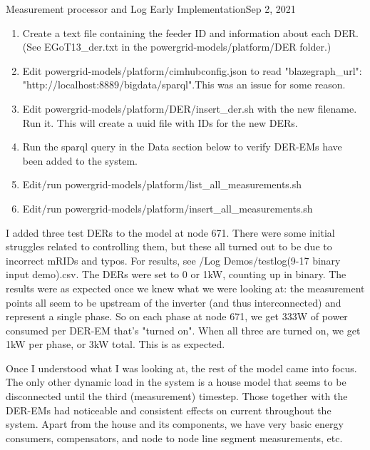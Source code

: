 \begin{entry}{Measurement processor and Log Early Implementation}{Sep 2, 2021}
    \begin{enumerate}
        \item Create a text file containing the feeder ID and information about each DER. (See EGoT13\_der.txt in the
        powergrid-models/platform/DER folder.)
        \item Edit powergrid-models/platform/cimhubconfig.json to read "blazegraph\_url":
        "http://localhost:8889/bigdata/sparql".This was an issue for some reason.
        \item Edit powergrid-models/platform/DER/insert\_der.sh with the new filename. Run it. This will create a uuid
        file with IDs for the new DERs.
        \item Run the sparql query in the Data section below to verify DER-EMs have been added to the system.
        \item Edit/run powergrid-models/platform/list\_all\_measurements.sh
        \item Edit/run powergrid-models/platform/insert\_all\_measurements.sh
    \end{enumerate}

    I added three test DERs to the model at node 671. There were some initial struggles related to controlling them,
    but these all turned out to be due to incorrect mRIDs and typos. For results,
    see /Log Demos/testlog(9-17 binary input demo).csv. The DERs were set to 0 or 1kW, counting up in binary. The
    results were as expected once we knew what we were looking at: the measurement points all seem to be upstream of
    the inverter (and thus interconnected) and represent a single phase. So on each phase at node 671, we get 333W of
    power consumed per DER-EM that's "turned on". When all three are turned on, we get 1kW per phase, or 3kW total. This
    is as expected.

    Once I understood what I was looking at, the rest of the model came into focus. The only other dynamic load in the
    system is a house model that seems to be disconnected until the third (measurement) timestep. Those together with
    the DER-EMs had noticeable and consistent effects on current throughout the system. Apart from the house and its
    components, we have very basic energy consumers, compensators, and node to node line segment measurements, etc.


    \data
    

\end{entry}
